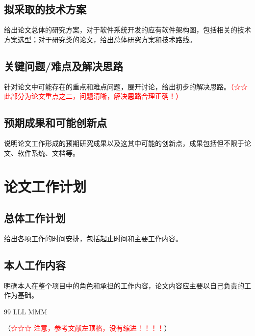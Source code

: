 \documentclass[a4paper,12pt]{article}
\begin{document}
\subsection{拟采取的技术方案}
{\songlatin 给出论文总体的研究方案，对于软件系统开发的应有软件架构图，包括相关的技术方案选型；对于研究类的论文，给出总体研究方案和技术路线。\par}

\subsection{关键问题/难点及解决思路}
{\songlatin 针对论文中可能存在的重点和难点问题，展开讨论，给出初步的解决思路。\textcolor{red}{（☆☆ 此部分为论文重点之二，问题清晰，解决\textbf{思路}合理正确！）}\par}

\subsection{预期成果和可能创新点}
{\songlatin 说明论文工作形成的预期研究成果以及这其中可能的创新点，成果包括但不限于论文、软件系统、文档等。\par}


\section{论文工作计划}
\subsection{总体工作计划}
{\songlatin 给出各项工作的时间安排，包括起止时间和主要工作内容。\par}

\subsection{本人工作内容}
{\songlatin 明确本人在整个项目中的角色和承担的工作内容，论文内容应主要以自己负责的工作为基础。\par}


\begin{thebibliography}{99}
 LLL
 MMM
\end{thebibliography}
\noindent （\textcolor{red}{☆☆☆ 注意，参考文献左顶格，没有缩进！！！！}）
\end{document}
